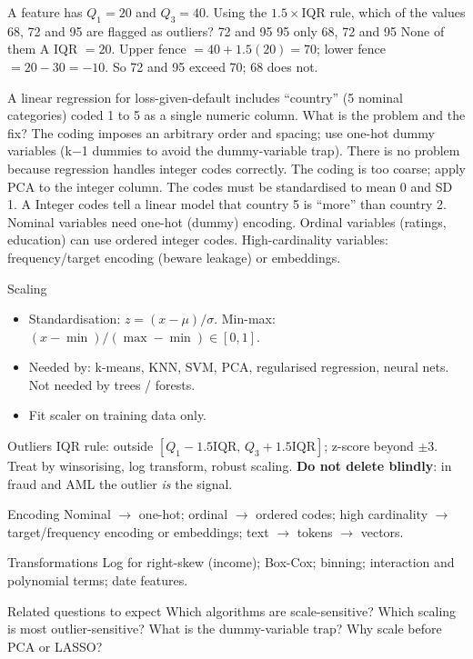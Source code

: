 {A feature has $Q_1=20$ and $Q_3=40$. Using the $1.5\times$IQR rule, which of the values 68, 72 and 95 are flagged as outliers?}
{72 and 95}
{95 only}
{68, 72 and 95}
{None of them}
{A}
{IQR $=20$. Upper fence $=40+1.5(20)=70$; lower fence $=20-30=-10$. So 72 and 95 exceed 70; 68 does not.}

{A linear regression for loss-given-default includes ``country'' (5 nominal categories) coded 1 to 5 as a single numeric column. What is the problem and the fix?}
{The coding imposes an arbitrary order and spacing; use one-hot dummy variables (k$-$1 dummies to avoid the dummy-variable trap).}
{There is no problem because regression handles integer codes correctly.}
{The coding is too coarse; apply PCA to the integer column.}
{The codes must be standardised to mean 0 and SD 1.}
{A}
{Integer codes tell a linear model that country 5 is ``more'' than country 2. Nominal variables need one-hot (dummy) encoding. Ordinal variables (ratings, education) can use ordered integer codes. High-cardinality variables: frequency/target encoding (beware leakage) or embeddings.}

{\begin{block}{Scaling}
		\begin{itemize}
			\item Standardisation: $z=(x-\mu)/\sigma$. Min-max: $(x-\min)/(\max-\min)\in[0,1]$.
			\item Needed by: k-means, KNN, SVM, PCA, regularised regression, neural nets. Not needed by trees / forests.
			\item Fit scaler on training data only.
	\end{itemize}\end{block}
	\begin{block}{Outliers}
		IQR rule: outside $[Q_1-1.5\text{IQR},\,Q_3+1.5\text{IQR}]$; z-score beyond $\pm3$. Treat by winsorising, log transform, robust scaling. \textbf{Do not delete blindly}: in fraud and AML the outlier \emph{is} the signal.
\end{block}}
{\begin{block}{Encoding}
		Nominal $\rightarrow$ one-hot; ordinal $\rightarrow$ ordered codes; high cardinality $\rightarrow$ target/frequency encoding or embeddings; text $\rightarrow$ tokens $\rightarrow$ vectors.
	\end{block}
	\begin{block}{Transformations}
		Log for right-skew (income); Box-Cox; binning; interaction and polynomial terms; date features.
	\end{block}
	\begin{alertblock}{Related questions to expect}
		Which algorithms are scale-sensitive? Which scaling is most outlier-sensitive? What is the dummy-variable trap? Why scale before PCA or LASSO?
\end{alertblock}}

